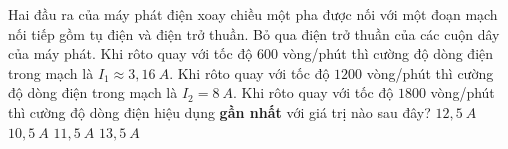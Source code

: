 \begin{vidu*} %
	Hai đầu ra của máy phát điện xoay chiều một pha được nối với một đoạn mạch nối tiếp gồm tụ điện và điện trở thuần. Bỏ qua điện trở thuần của các cuộn dây của máy phát. Khi rôto quay với tốc độ $600$ vòng/phút thì cường độ dòng điện trong mạch là $I_1\approx 3,16\ A$. Khi rôto quay với tốc độ $1200$ vòng/phút thì cường độ dòng điện trong mạch là $I_2=8\ A$. Khi rôto quay với tốc độ $1800$ vòng/phút thì cường độ dòng điện hiệu dụng \textbf{gần nhất} với giá trị nào  sau đây?
	\choice
	{\True $12,5\ A$}
	{$10,5\ A$}
	{$11,5\ A$}
	{$13,5\ A$}
\end{vidu*}
